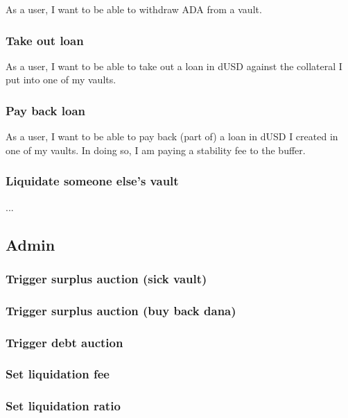 \documentclass{article} %
\begin{document}
As a user, I want to be able to withdraw ADA from a vault.

\subsubsection{Take out loan}

As a user, I want to be able to take out a loan in dUSD against the collateral I
put into one of my vaults.

\subsubsection{Pay back loan}

As a user, I want to be able to pay back (part of) a loan in dUSD I created in
one of my vaults. In doing so, I am paying a stability fee to the buffer.

\subsubsection{Liquidate someone else's vault}

...

\subsection{Admin}

\subsubsection{Trigger surplus auction (sick vault)}

\subsubsection{Trigger surplus auction (buy back dana)}

\subsubsection{Trigger debt auction}

\subsubsection{Set liquidation fee}

\subsubsection{Set liquidation ratio}
\end{document}
